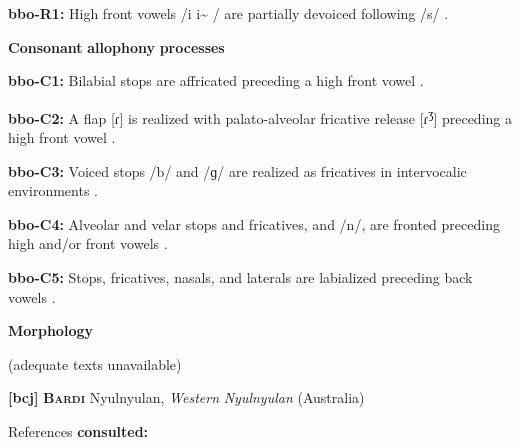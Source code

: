 \begin{styleBody}
\textbf{bbo-R1:} High front vowels /i i\~{} / are partially devoiced following /s/ \citep[28-9]{Morse1976}.
\end{styleBody}

\begin{styleBody}
\textbf{Consonant} \textbf{allophony} \textbf{processes}
\end{styleBody}

\begin{styleBody}
\textbf{bbo-C1:} Bilabial stops are affricated preceding a high front vowel \citep[20]{Morse1976}.
\end{styleBody}

\begin{styleBody}
\textbf{bbo-C2:} A flap [ɾ] is realized with palato-alveolar fricative release [ɾ\textsuperscript{ʒ}] preceding a high front vowel \citep[25]{Morse1976}.
\end{styleBody}

\begin{styleBody}
\textbf{bbo-C3:} Voiced stops /b/ and /ɡ/ are realized as fricatives in intervocalic environments \citep[22]{Morse1976}.
\end{styleBody}

\begin{styleBody}
\textbf{bbo-C4:} Alveolar and velar stops and fricatives, and /n/, are fronted preceding high and/or front vowels \citep[20-23]{Morse1976}.
\end{styleBody}

\begin{styleBody}
\textbf{bbo-C5:} Stops, fricatives, nasals, and laterals are labialized preceding back vowels \citep[20]{Morse1976}.
\end{styleBody}

\begin{styleBody}
\textbf{Morphology}
\end{styleBody}

\begin{styleBody}
(adequate texts unavailable)
\end{styleBody}

\begin{styleBody}
\textbf{[bcj]}   \textbf{\textsc{Bardi}  }  Nyulnyulan, \textit{Western} \textit{Nyulnyulan} (Australia)
\end{styleBody}

\begin{styleBody}
References \textbf{consulted:} \citet{Bowern2012}
\end{styleBody}

